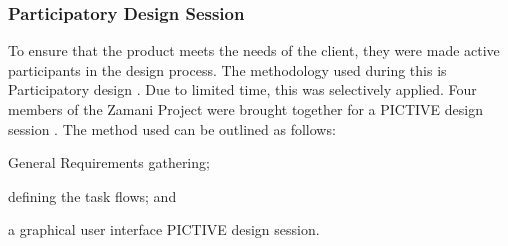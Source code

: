 \subsubsection{Participatory Design Session}

To ensure that the product meets the needs of the client, they were made active participants
in the design process. The methodology used during this is Participatory design
\cite{muller1993participatory}. Due to limited time, this was selectively applied.
Four members of the Zamani Project were
brought together for a PICTIVE design session \cite{muller1991pictive}.
The method used can be outlined as follows:
\begin{inparaenum}[(i)]
\item General Requirements gathering;
\item defining the task flows; and
\item a graphical user interface PICTIVE design session.
\end{inparaenum}

